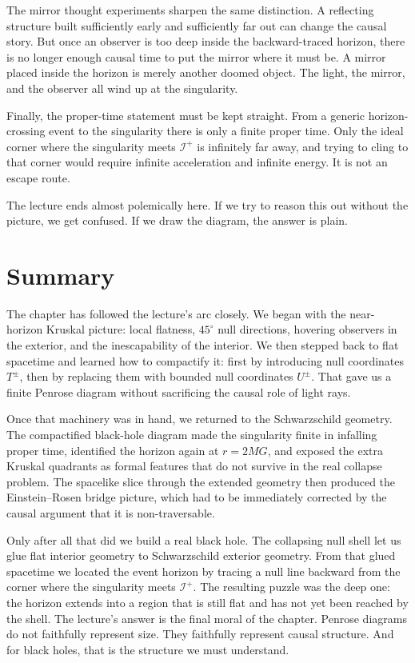 The mirror thought experiments sharpen the same distinction. A reflecting structure built sufficiently early and sufficiently far out can change the causal story. But once an observer is too deep inside the backward-traced horizon, there is no longer enough causal time to put the mirror where it must be. A mirror placed inside the horizon is merely another doomed object. The light, the mirror, and the observer all wind up at the singularity.

Finally, the proper-time statement must be kept straight. From a generic horizon-crossing event to the singularity there is only a finite proper time. Only the ideal corner where the singularity meets \(\mathscr I^+\) is infinitely far away, and trying to cling to that corner would require infinite acceleration and infinite energy. It is not an escape route.

The lecture ends almost polemically here. If we try to reason this out without the picture, we get confused. If we draw the diagram, the answer is plain.

\section{Summary}

The chapter has followed the lecture's arc closely. We began with the near-horizon Kruskal picture: local flatness, \(45^\circ\) null directions, hovering observers in the exterior, and the inescapability of the interior. We then stepped back to flat spacetime and learned how to compactify it: first by introducing null coordinates \(T^\pm\), then by replacing them with bounded null coordinates \(U^\pm\). That gave us a finite Penrose diagram without sacrificing the causal role of light rays.

Once that machinery was in hand, we returned to the Schwarzschild geometry. The compactified black-hole diagram made the singularity finite in infalling proper time, identified the horizon again at \(r=2MG\), and exposed the extra Kruskal quadrants as formal features that do not survive in the real collapse problem. The spacelike slice through the extended geometry then produced the Einstein--Rosen bridge picture, which had to be immediately corrected by the causal argument that it is non-traversable.

Only after all that did we build a real black hole. The collapsing null shell let us glue flat interior geometry to Schwarzschild exterior geometry. From that glued spacetime we located the event horizon by tracing a null line backward from the corner where the singularity meets \(\mathscr I^+\). The resulting puzzle was the deep one: the horizon extends into a region that is still flat and has not yet been reached by the shell. The lecture's answer is the final moral of the chapter. Penrose diagrams do not faithfully represent size. They faithfully represent causal structure. And for black holes, that is the structure we must understand.
